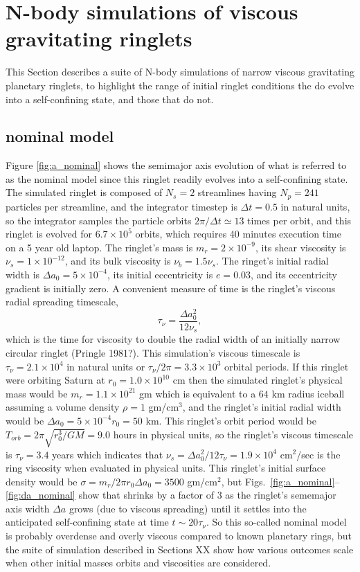 \documentclass[preprint]{aastex62}
\begin{document}
\section{N-body simulations of viscous gravitating ringlets}
\label{sec:nbody}

This Section describes a suite of N-body simulations of narrow viscous gravitating planetary
ringlets, to highlight the range of initial ringlet conditions the do evolve into
a self-confining state, and those that do not.

\subsection{nominal model}
\label{subsec:nominal}

Figure \ref{fig:a_nominal} shows the semimajor axis evolution of what is referred to
as the nominal model since this ringlet readily evolves into a self-confining state.
The simulated ringlet is composed of $N_s=2$ streamlines having $N_p=241$ particles
per streamline, and the integrator timestep is $\Delta t=0.5$ in natural units, so
the integrator samples the particle orbits $2\pi/\Delta t\simeq13$ times per orbit, and this
ringlet is evolved for $6.7\times10^5$ orbits, which requires 40 minutes execution time
on a 5 year old laptop. The ringlet's mass is
$m_r=2\times10^{-9}$, its shear viscosity is $\nu_s=1\times10^{-12}$, and its
bulk viscosity is $\nu_b=1.5\nu_s$. The ringet's initial radial width is
$\Delta a_0 = 5\times10^{-4}$, its initial eccentricity is $e=0.03$, and its
eccentricity gradient is initially zero. A convenient measure of time is the ringlet's
viscous radial spreading timescale,
\begin{equation}
    \tau_\nu=\frac{\Delta a_0^2}{12\nu_s}, 
\end{equation}
which is the time for viscosity to double the radial width of an initially narrow circular ringlet
(Pringle 1981?). This simulation's viscous timescale is $\tau_\nu=2.1\times10^4$ in natural units
or $\tau_\nu/2\pi=3.3\times10^3$ orbital periods. If this ringlet were orbiting Saturn
at $r_0=1.0\times10^{10}$ cm then the simulated ringlet's physical mass
would be $m_r=1.1\times10^{21}$ gm which is equivalent to a $64$ km radius iceball assuming
a volume density $\rho=1$ gm/cm$^3$, and the ringlet's initial radial width would be
$\Delta a_0 = 5\times10^{-4}r_0=50$ km. This ringlet's
orbit period would be $T_{orb}=2\pi\sqrt{r_0^3/GM}=9.0$ hours in physical units, so 
the ringlet's viscous timescale is $\tau_\nu=3.4$ years 
which indicates that $\nu_s=\Delta a_0^2/12\tau_\nu = 1.9\times10^4$ cm$^2$/sec
is the ring viscosity when evaluated in physical units. 
This ringlet's initial surface density would be $\sigma=m_r/2\pi r_0\Delta a_0=3500$ gm/cm$^2$, but
Figs.\ \ref{fig:a_nominal}--\ref{fig:da_nominal} show that shrinks by a factor of 3 as the 
ringlet's sememajor axis width $\Delta a$ grows (due to viscous spreading) until it settles into
the anticipated self-confining state at time $t\sim20\tau_\nu$.
So this so-called nominal
model is probably overdense and overly viscous compared to known planetary rings,
but the suite of simulation described in Sections XX show how various outcomes scale when
other initial masses orbits and viscosities are considered.
\end{document}
